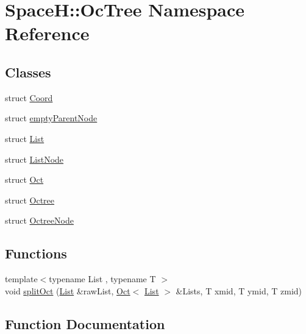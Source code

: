 \hypertarget{namespace_space_h_1_1_oc_tree}{}\section{SpaceH\+:\+:Oc\+Tree Namespace Reference}
\label{namespace_space_h_1_1_oc_tree}
\subsection*{Classes}
\begin{DoxyCompactItemize}
\item 
struct \mbox{\hyperlink{struct_space_h_1_1_oc_tree_1_1_coord}{Coord}}
\item 
struct \mbox{\hyperlink{struct_space_h_1_1_oc_tree_1_1empty_parent_node}{empty\+Parent\+Node}}
\item 
struct \mbox{\hyperlink{struct_space_h_1_1_oc_tree_1_1_list}{List}}
\item 
struct \mbox{\hyperlink{struct_space_h_1_1_oc_tree_1_1_list_node}{List\+Node}}
\item 
struct \mbox{\hyperlink{struct_space_h_1_1_oc_tree_1_1_oct}{Oct}}
\item 
struct \mbox{\hyperlink{struct_space_h_1_1_oc_tree_1_1_octree}{Octree}}
\item 
struct \mbox{\hyperlink{struct_space_h_1_1_oc_tree_1_1_octree_node}{Octree\+Node}}
\end{DoxyCompactItemize}
\subsection*{Functions}
\begin{DoxyCompactItemize}
\item 
{\footnotesize template$<$typename List , typename T $>$ }\\void \mbox{\hyperlink{namespace_space_h_1_1_oc_tree_af27f1253cb5f80c85149b2ccbc2b6f0b}{split\+Oct}} (\mbox{\hyperlink{struct_space_h_1_1_oc_tree_1_1_list}{List}} \&raw\+List, \mbox{\hyperlink{struct_space_h_1_1_oc_tree_1_1_oct}{Oct}}$<$ \mbox{\hyperlink{struct_space_h_1_1_oc_tree_1_1_list}{List}} $>$ \&Lists, T xmid, T ymid, T zmid)
\end{DoxyCompactItemize}


\subsection{Function Documentation}
\mbox{\label{namespace_space_h_1_1_oc_tree_af27f1253cb5f80c85149b2ccbc2b6f0b}} 
